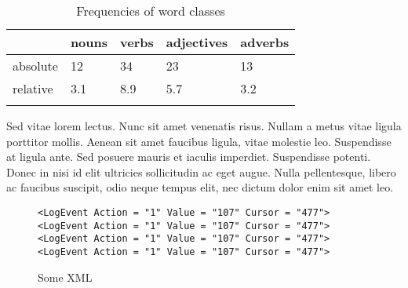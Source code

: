 \begin{table}
\caption{Frequencies of word classes}
\label{tab:1:frequencies}
 \begin{tabular}{lllll} %
  \lsptoprule
            & nouns & verbs & adjectives & adverbs\\ %
  \midrule
  absolute  &   12 &    34  &    23     & 13\\
  relative  &   3.1 &   8.9 &    5.7    & 3.2\\
  \lspbottomrule
 \end{tabular}
\end{table}


Sed vitae lorem lectus. Nunc sit amet venenatis risus. Nullam a metus vitae ligula porttitor mollis. Aenean sit amet faucibus ligula, vitae molestie leo. Suspendisse at ligula ante. Sed posuere mauris et iaculis imperdiet. Suspendisse potenti. Donec in nisi id elit ultricies sollicitudin ac eget augue. Nulla pellentesque, libero ac faucibus suscipit, odio neque tempus elit, nec dictum dolor enim sit amet leo. 

\begin{figure}
\caption{Some XML}
\begin{verbatim}
<LogEvent Action = "1" Value = "107" Cursor = "477">
<LogEvent Action = "1" Value = "107" Cursor = "477">
<LogEvent Action = "1" Value = "107" Cursor = "477">
<LogEvent Action = "1" Value = "107" Cursor = "477">
\end{verbatim}
\end{figure}
